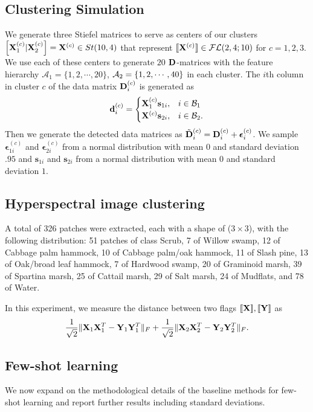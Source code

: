 \subsection{Clustering Simulation}
We generate three Stiefel matrices to serve as centers of our clusters $\left[ \mathbf{X}_1^{(c)} | \mathbf{X}_2^{(c)} \right]= \mathbf{X}^{(c)} \in St(10,4)$ that represent $[\![ \mathbf{X}^{(c)} ]\!] \in \mathcal{FL}(2,4;10)$ for $c = 1,2,3$. We use each of these centers to generate $20$ $\mathbf{D}$-matrices with the feature hierarchy $\mathcal{A}_1 = \{ 1,2, \cdots, 20\}$, $\mathcal{A}_2 = \{1,2, \cdots, 40\}$ in each cluster. The $i$th column in cluster $c$ of the data matrix $\mathbf{D}_i^{(c)}$ is generated as
\begin{equation}
    \mathbf{d}_i^{(c)} = \begin{cases}
        \mathbf{X}_1^{(c)}\mathbf{s}_{1i} , & i \in \mathcal{B}_1\\
        \mathbf{X}^{(c)}\mathbf{s}_{2i} , & i \in \mathcal{B}_2.\\
    \end{cases}
\end{equation}
Then we generate the detected data matrices as $\tilde{\mathbf{D}}_i^{(c)} = \mathbf{D}_i^{(c)}+\boldsymbol{\epsilon}_{i}^{(c)}$. We sample $\boldsymbol{\epsilon}_{1i}^{(c)}$ and $\boldsymbol{\epsilon}_{2i}^{(c)}$ from a normal distribution with mean $0$ and standard deviation $.95$ and $\mathbf{s}_{1i}$ and $\mathbf{s}_{2i}$ from a normal distribution with mean $0$ and standard deviation $1$. 



\subsection{Hyperspectral image clustering}
A total of 326 patches were extracted, each with a shape of ($3 \times 3$), with the following distribution: 51 patches of class Scrub, 7 of Willow swamp, 12 of Cabbage palm hammock, 10 of Cabbage palm/oak hammock, 11 of Slash pine, 13 of Oak/broad leaf hammock, 7 of Hardwood swamp, 20 of Graminoid marsh, 39 of Spartina marsh, 25 of Cattail marsh, 29 of Salt marsh, 24 of Mudflats, and 78 of Water.

In this experiment, we measure the distance between two flags $[\![\mathbf{X}]\!],[\![\mathbf{Y}]\!]$ as
\begin{equation}
    \frac{1}{\sqrt{2}}\|\mathbf{X}_1\mathbf{X}_1^T - \mathbf{Y}_1 \mathbf{Y}_1^T\|_F + \frac{1}{\sqrt{2}}\|\mathbf{X}_2\mathbf{X}_2^T - \mathbf{Y}_2 \mathbf{Y}_2^T\|_F.
\end{equation}

\subsection{Few-shot learning}
We now expand on the methodological details of the baseline methods for few-shot learning and report further results including standard deviations.

